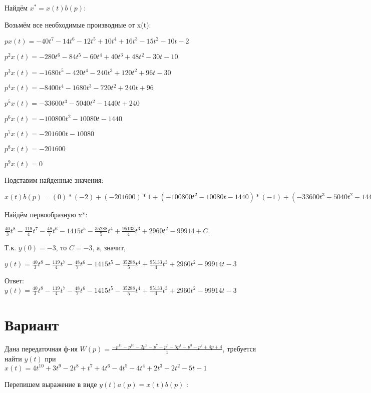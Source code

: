 \documentclass{article}
\begin{document}
{{{{{Найдём $x^*=x(t)b(p)$:

Возьмём все необходимые производные от x(t):

$px(t)=-40t^{7}-14t^{6}-12t^{5}+10t^{4}+16t^{3}-15t^{2}-10t-2$

$p^2x(t)=-280t^{6}-84t^{5}-60t^{4}+40t^{3}+48t^{2}-30t-10$

$p^3x(t)=-1680t^{5}-420t^{4}-240t^{3}+120t^{2}+96t-30$

$p^4x(t)=-8400t^{4}-1680t^{3}-720t^{2}+240t+96$

$p^5x(t)=-33600t^{3}-5040t^{2}-1440t+240$

$p^6x(t)=-100800t^{2}-10080t-1440$

$p^7x(t)=-201600t-10080$

$p^8x(t)=-201600$

$p^9x(t)=0$

Подставим найденные значения:

$x(t)b(p) = (0)*(-2)+(-201600)*1+(-100800t^{2}-10080t-1440)*(-1)+(-33600t^{3}-5040t^{2}-1440t+240)*1+(-8400t^{4}-1680t^{3}-720t^{2}+240t+96)*1+(-280t^{6}-84t^{5}-60t^{4}+40t^{3}+48t^{2}-30t-10)*1+(-40t^{7}-14t^{6}-12t^{5}+10t^{4}+16t^{3}-15t^{2}-10t-2)*(-3)=120t^{7}-238t^{6}-48t^{5}-8490t^{4}-35288t^{3}+95133t^{2}+8880t$





Найдём первообразную x*:

$\frac{40}{3}t^{8}-\frac{119}{4}t^{7}-\frac{48}{7}t^{6}-1415t^{5}-\frac{35288}{5}t^{4}+\frac{95133}{4}t^{3}+2960t^{2}-99914+C.$

Т.к. $y(0)=-3$, то $C=-3$, а, значит, 

$y(t)=\frac{40}{3}t^{8}-\frac{119}{4}t^{7}-\frac{48}{7}t^{6}-1415t^{5}-\frac{35288}{5}t^{4}+\frac{95133}{4}t^{3}+2960t^{2}-99914t-3$

Ответ: $y(t) = \frac{40}{3}t^{8}-\frac{119}{4}t^{7}-\frac{48}{7}t^{6}-1415t^{5}-\frac{35288}{5}t^{4}+\frac{95133}{4}t^{3}+2960t^{2}-99914t-3$

\section{Вариант}

Дана передаточная ф-ия $W(p)=\frac{-p^{11}-p^{10}-2p^{9}-p^{7}-p^{6}-5p^{4}-p^{3}-p^{2}+4p+4}{1}$, требуется найти $y(t)$ при $x(t)=4t^{10}+3t^{9}-2t^{8}+t^{7}+4t^{6}-4t^{5}-4t^{4}+2t^{3}-2t^{2}-5t-1$

Перепишем выражение в виде $y(t)a(p)=x(t)b(p)$ :

}}}}}
\end{document}
